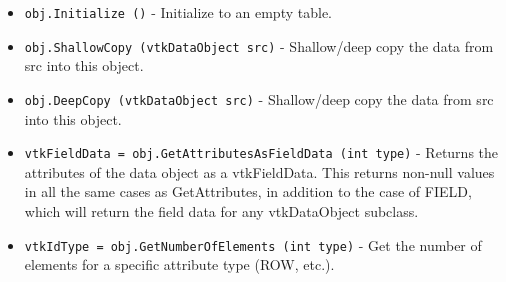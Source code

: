 \begin{itemize}
\item  \verb|obj.Initialize ()| -  Initialize to an empty table.

\item  \verb|obj.ShallowCopy (vtkDataObject src)| -  Shallow/deep copy the data from src into this object.

\item  \verb|obj.DeepCopy (vtkDataObject src)| -  Shallow/deep copy the data from src into this object.

\item  \verb|vtkFieldData = obj.GetAttributesAsFieldData (int type)| -  Returns the attributes of the data object as a vtkFieldData.
 This returns non-null values in all the same cases as GetAttributes,
 in addition to the case of FIELD, which will return the field data
 for any vtkDataObject subclass.

\item  \verb|vtkIdType = obj.GetNumberOfElements (int type)| -  Get the number of elements for a specific attribute type (ROW, etc.).

\end{itemize}
